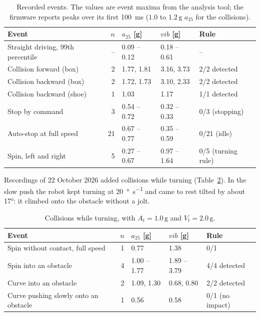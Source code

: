 \documentclass[11pt,a4paper]{article}
\newcommand{\g}{\,\mathrm{g}}
\newcommand{\azf}{a_{25}}
\newcommand{\vib}{\mathit{vib}}
\begin{document}
\begin{table}[!htbp]
  \centering
  \small
  \begin{tabular}{l r l l l}
    \hline
    Event & $n$ & $\azf$ [g] & $\vib$ [g] & Rule \\
    \hline
    Straight driving, 99th percentile & -- & 0.09 -- 0.12 & 0.18 -- 0.61 & -- \\
    Collision forward (box)           & 2  & 1.77, 1.81   & 3.16, 3.73   & 2/2 detected \\
    Collision backward (box)          & 2  & 1.72, 1.73   & 3.10, 2.33   & 2/2 detected \\
    Collision backward (shoe)         & 1  & 1.03         & 1.17         & 1/1 detected \\
    Stop by command                   & 3  & 0.54 -- 0.72 & 0.32 -- 0.33 & 0/3 (stopping) \\
    Auto-stop at full speed           & 21 & 0.67 -- 0.77 & 0.35 -- 0.59 & 0/21 (idle) \\
    Spin, left and right              & 5  & 0.27 -- 0.67 & 0.97 -- 1.64 & 0/5 (turning rule) \\
    \hline
  \end{tabular}
  \caption{Recorded events. The values are event maxima from the analysis tool; the firmware
    reports peaks over its first \SI{100}{\milli\second} ($1.0$ to $1.2\g$ $\azf$ for the
    collisions).}
  \label{tab:evidence}
\end{table}

Recordings of 22 October 2026 added collisions while turning (Table~\ref{tab:turning}). In the
slow push the robot kept turning at \SI{20}{\degree\per\second} and came to rest tilted by about
\ang{17}: it climbed onto the obstacle without a jolt.

\begin{table}[!htbp]
  \centering
  \small
  \begin{tabular}{l r l l l}
    \hline
    Event & $n$ & $\azf$ [g] & $\vib$ [g] & Rule \\
    \hline
    Spin without contact, full speed      & 1 & 0.77         & 1.38         & 0/1 \\
    Spin into an obstacle                 & 4 & 1.00 -- 1.77 & 1.89 -- 3.79 & 4/4 detected \\
    Curve into an obstacle                & 2 & 1.09, 1.30   & 0.68, 0.80   & 2/2 detected \\
    Curve pushing slowly onto an obstacle & 1 & 0.56         & 0.58         & 0/1 (no impact) \\
    \hline
  \end{tabular}
  \caption{Collisions while turning, with $A_t = 1.0\g$ and $V_t = 2.0\g$.}
  \label{tab:turning}
\end{table}
\end{document}
